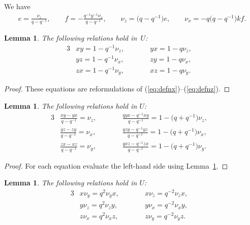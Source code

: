 \documentclass[11pt]{article}
\numberwithin{equation}{section}
\newtheorem{Lemma}[Theorem]{Lemma}
\begin{document}
\begin{Note}
\label{note:efview}
We have
\begin{gather*}
 e =\frac{\nu_z}{q-q^{-1}},
\qquad
f =-\frac{q^{-1} y^{-1}\nu_x}{q-q^{-1}},
\qquad
 \nu_z = \big(q-q^{-1}\big)e, \qquad
\nu_x = -q\big(q-q^{-1}\big)kf.
\end{gather*}
\end{Note}




\begin{Lemma}
\label{lem:prod}
The following relations hold in~$U$:
\begin{alignat}{3}
& xy =1-q^{-1}\nu_z, \qquad && yx = 1-q\nu_z,&
\label{eq:xyx}
\\
& yz =1-q^{-1}\nu_x, \qquad &&  zy = 1-q\nu_x,&
\label{eq:yzy}
\\
& zx =1-q^{-1}\nu_y, \qquad && xz = 1-q\nu_y.&
\label{eq:zxz}
\end{alignat}
\end{Lemma}

\begin{proof}
These equations are
reformulations of
(\ref{eq:defnx})--(\ref{eq:defnz}).
\end{proof}


\begin{Lemma}
The following relations hold in
$U$:
\begin{alignat}{3}
& \frac{xy-yx}{q-q^{-1}}=
\nu_z, \qquad &&
\frac{qyx-q^{-1}xy}{q-q^{-1}}= 1-\big(q+q^{-1}\big)\nu_z,&
\label{eq:double1}
\\
& \frac{yz-zy}{q-q^{-1}}=
\nu_x,\qquad&&
\frac{qzy-q^{-1}yz}{q-q^{-1}}= 1-\big(q+q^{-1}\big)\nu_x,&
\label{eq:double2}
\\
& \frac{zx-xz}{q-q^{-1}}=
\nu_y,\qquad &&
\frac{qxz-q^{-1}zx}{q-q^{-1}}= 1-\big(q+q^{-1}\big)\nu_y. &
\label{eq:double3}
\end{alignat}
\end{Lemma}

\begin{proof}
For each equation
evaluate the left-hand side using
Lemma~\ref{lem:prod}.
\end{proof}


\begin{Lemma}
\label{lem:qcom}
The following relations hold in
$U$:
\begin{alignat}{3}
& x \nu_y = q^2 \nu_y x, \qquad &&
x \nu_z = q^{-2} \nu_z x, &
\label{eq:com1}
\\
& y \nu_z = q^2 \nu_z y, \qquad &&
y \nu_x = q^{-2} \nu_x y, &
\label{eq:com2}
\\
& z \nu_x = q^2 \nu_x z, \qquad &&
z \nu_y = q^{-2} \nu_y z. &
\label{eq:com3}
\end{alignat}
\end{Lemma}
\end{document}
